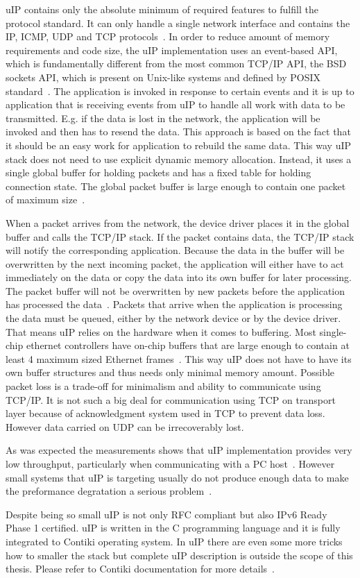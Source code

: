 uIP contains only the absolute minimum of required features to fulfill the protocol standard.
It can only handle a single network interface and contains the IP, ICMP, UDP and TCP protocols~\cite{contiki-docs}.
In order to reduce amount of memory requirements and code size,
the uIP implementation uses an event-based API, which is fundamentally different
from the most common TCP/IP API, the BSD sockets API, which is present on Unix-like systems
and defined by POSIX standard~\cite{thesis-programming,posix}.
The application is invoked in response to certain events and
it is up to application that is receiving events from uIP to handle all
work with data to be transmitted. E.g. if the data is lost in the network,
the application will be invoked and then has to resend the data.
This approach is based on the fact that it should be an easy work for application
to rebuild the same data.
This way uIP stack does not need to use explicit dynamic memory allocation.
Instead, it uses a single global buffer for holding packets and has a fixed
table for holding connection state.
The global packet buffer is large enough to contain one packet of maximum size~\cite{contiki-docs}.

When a packet arrives from the network, the device driver places it in the
global buffer and calls the TCP/IP stack.
If the packet contains data, the TCP/IP stack will notify the corresponding application.
Because the data in the buffer will be overwritten by the next incoming packet,
the application will either have to act immediately on the data or copy the data into
its own buffer for later processing.
The packet buffer will not be overwritten by new packets before the application has processed the data~\cite{contiki-docs}.
Packets that arrive when the application is processing the data must be queued,
either by the network device or by the device driver.
That means uIP relies on the hardware when it comes to buffering.
Most single-chip ethernet controllers have on-chip buffers
that are large enough to contain at least 4 maximum sized Ethernet frames~\cite{contiki-docs}.
This way uIP does not have to have its own buffer structures and thus
needs only minimal memory amount.
Possible packet loss is a trade-off for minimalism and ability to communicate using TCP/IP.
It is not such a big deal for communication using TCP on transport layer
because of acknowledgment system used in TCP to prevent data loss.
However data carried on UDP can be irrecoverably lost.

As was expected the measurements shows that uIP implementation provides very low
throughput, particularly when communicating with a PC host~\cite{thesis-towards}.
However small systems that uIP is targeting usually do not produce enough data
to make the preformance degratation a serious problem~\cite{thesis-towards}.

Despite being so small uIP is not only RFC compliant but also IPv6 Ready Phase 1 certified.
uIP is written in the C programming language and it is fully integrated to Contiki operating system.
In uIP there are even some more tricks how to smaller the stack
but complete uIP description is outside the scope of this thesis.
Please refer to Contiki documentation for more details~\cite{contiki-docs}.
